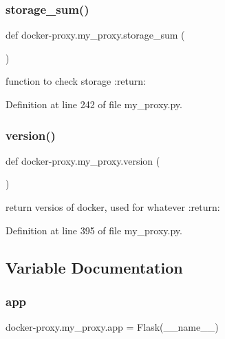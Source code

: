 \subsubsection{\texorpdfstring{storage\+\_\+sum()}{storage\_sum()}}
{\footnotesize\ttfamily def docker-\/proxy.\+my\+\_\+proxy.\+storage\+\_\+sum (\begin{DoxyParamCaption}{ }\end{DoxyParamCaption})}

\begin{DoxyVerb}function to check storage
:return:
\end{DoxyVerb}
 

Definition at line 242 of file my\+\_\+proxy.\+py.

\hypertarget{namespacedocker-proxy_1_1my__proxy_ad3276ec211f2fe107e03e4ed5e346df6}{}\label{namespacedocker-proxy_1_1my__proxy_ad3276ec211f2fe107e03e4ed5e346df6} 
\subsubsection{\texorpdfstring{version()}{version()}}
{\footnotesize\ttfamily def docker-\/proxy.\+my\+\_\+proxy.\+version (\begin{DoxyParamCaption}{ }\end{DoxyParamCaption})}

\begin{DoxyVerb}return versios of docker, used for whatever
:return:
\end{DoxyVerb}
 

Definition at line 395 of file my\+\_\+proxy.\+py.



\subsection{Variable Documentation}
\hypertarget{namespacedocker-proxy_1_1my__proxy_a1316b64a06ccf8940bd886efa8d18660}{}\label{namespacedocker-proxy_1_1my__proxy_a1316b64a06ccf8940bd886efa8d18660} 
\subsubsection{\texorpdfstring{app}{app}}
{\footnotesize\ttfamily docker-\/proxy.\+my\+\_\+proxy.\+app = Flask(\+\_\+\+\_\+name\+\_\+\+\_\+)}



